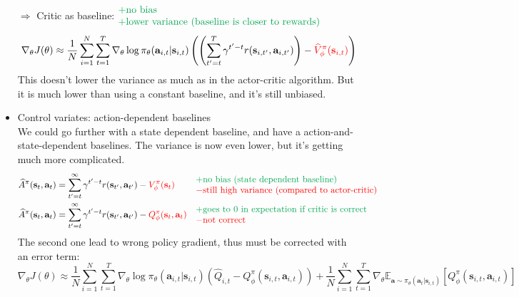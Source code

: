 \begin{itemize}
	$\Rightarrow$ Critic as baseline: $\color{Green}\begin{matrix*}[l]
		+ \text{no bias}\\
		+ \text{lower variance (baseline is closer to rewards)}
	\end{matrix*}$
	\[\nabla_\theta J(\theta) \approx \frac{1}{N} \sum_{i=1}^N \sum_{t=1}^T \nabla_\theta\log\pi_{\theta}(\textbf{a}_{i,t}|\textbf{s}_{i,t}) \left( \left( \sum_{t' = t}^T \gamma^{t'-t} r(\textbf{s}_{i,t'}, \textbf{a}_{i,t'}) \right) - {\color{red}\widehat{V}_\phi^\pi(\textbf{s}_{i,t})} \right)\]
	This doesn't lower the variance as much as in the actor-critic algorithm. But it is much lower than using a constant baseline, and it's still unbiased.
	
	\item Control variates: action-dependent baselines \cite{gu2016q}\\
	We could go further with a state dependent baseline, and have a action-and-state-dependent baselines. The variance is now even lower, but it's getting much more complicated.
	\begin{align*}
		&\widehat{A}^\pi(\textbf{s}_t, \textbf{a}_t) = \sum_{t' = t}^\infty \gamma^{t'-t} r(\textbf{s}_{t'}, \textbf{a}_{t'}) - {\color{red} V_\phi^\pi(\textbf{s}_{t})} && \begin{matrix*}[l]
			\color{Green} + \text{no bias (state dependent baseline)}\\
			\color{red} - \text{still high variance (compared to actor-critic)}
		\end{matrix*}\\
		&\widehat{A}^\pi(\textbf{s}_t, \textbf{a}_t) = \sum_{t' = t}^\infty \gamma^{t'-t} r(\textbf{s}_{t'}, \textbf{a}_{t'}) - {\color{red} Q_\phi^\pi(\textbf{s}_{t}, \textbf{a}_{t})} && \begin{matrix*}[l]
			\color{Green} + \text{goes to 0 in expectation if critic is correct}\\
			\color{red} - \text{not correct}
		\end{matrix*}
	\end{align*}
	The second one lead to wrong policy gradient, thus must be corrected with an error term:
	\begin{equation}
		\nabla_\theta J(\theta) \approx \frac{1}{N} \sum_{i=1}^N \sum_{t=1}^T \nabla_\theta\log\pi_{\theta}(\textbf{a}_{i,t}|\textbf{s}_{i,t}) \left( \widehat{Q}_{i,t} - Q^\pi_\phi(\textbf{s}_{i,t}, \textbf{a}_{i,t}) \right) + \frac{1}{N} \sum_{i=1}^N \sum_{t=1}^T \nabla_\theta\mathbb{E}_{\textbf{a}\sim\pi_\theta(\textbf{a}_t | \textbf{s}_{i,t})}[Q^\pi_\phi(\textbf{s}_{i,t}, \textbf{a}_{i,t})]

\end{equation}
\end{itemize}
